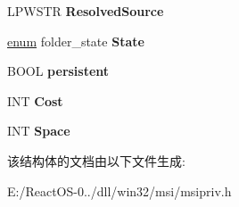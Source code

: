 \begin{DoxyCompactItemize}
\item 
\mbox{\label{structtag_m_s_i_f_o_l_d_e_r_af21ec14e8ce8b2a995a4a5ebf7b9d511}} 
L\+P\+W\+S\+TR {\bfseries Resolved\+Source}
\item 
\mbox{\label{structtag_m_s_i_f_o_l_d_e_r_af06db8942ec44622d78483f5d0ae3098}} 
\hyperlink{interfaceenum}{enum} folder\+\_\+state {\bfseries State}
\item 
\mbox{\label{structtag_m_s_i_f_o_l_d_e_r_af69659fcd172924a69a03d5fc360790f}} 
B\+O\+OL {\bfseries persistent}
\item 
\mbox{\label{structtag_m_s_i_f_o_l_d_e_r_a4be59d7da1d029bd8e655c966c4dcb1b}} 
I\+NT {\bfseries Cost}
\item 
\mbox{\label{structtag_m_s_i_f_o_l_d_e_r_ae347fc15900c2cdc17a9571f5f216988}} 
I\+NT {\bfseries Space}
\end{DoxyCompactItemize}


该结构体的文档由以下文件生成\+:\begin{DoxyCompactItemize}
\item 
E\+:/\+React\+O\+S-\/0../dll/win32/msi/msipriv.\+h\end{DoxyCompactItemize}
